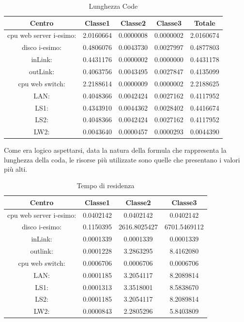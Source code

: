\begin{table}[H]
\begin{center}
\begin{tabular}{||c|c|c|c|c||}
\hline
Centro &Classe1 &Classe2 &Classe3 &Totale\\
\hline
\hline
 cpu web server i-esimo: 	&2.0160664	&0.0000008	&0.0000002	&2.0160674	\\\hline
 disco i-esimo: 	&0.4806076	&0.0043730	&0.0027997	&0.4877803	\\\hline
 inLink: 	&0.4431176	&0.0000002	&0.0000000	&0.4431178	\\\hline
 outLink: 	&0.4063756	&0.0043495	&0.0027847	&0.4135099	\\\hline
 cpu web switch: 	&2.2188614	&0.0000009	&0.0000002	&2.2188625	\\\hline
 LAN: 	&0.4048366	&0.0042424	&0.0027162	&0.4117952	\\\hline
 LS1: 	&0.4343910	&0.0044362	&0.0028402	&0.4416674	\\\hline
 LS2: 	&0.4048366	&0.0042424	&0.0027162	&0.4117952	\\\hline
 LW2: 	&0.0043640	&0.0000457	&0.0000293	&0.0044390	\\\hline
\end{tabular}
\end{center}
\caption{Lunghezza Code}
\label{lunghezzacode}
\end{table}
Come era logico aspettarsi, data la natura della formula che rappresenta la lunghezza della coda, le risorse più utilizzate sono quelle che presentano i valori più alti.
\begin{table}[H]
\begin{center}
\begin{tabular}{||c|c|c|c||}
\hline
Centro &Classe1 &Classe2 &Classe3\\
\hline
\hline
 cpu web server i-esimo: 	&0.0402142	&0.0402142	&0.0402142	\\\hline
 disco i-esimo: 	&0.1150395	&2616.8025427	&6701.5469112	\\\hline
 inLink: 	&0.0001339	&0.0001339	&0.0001339	\\\hline
 outlink: 	&0.0001228	&3.2863295	&8.4162080	\\\hline
 cpu web switch: 	&0.0006706	&0.0006706	&0.0006706	\\\hline
 LAN: 	&0.0001185	&3.2054117	&8.2089814	\\\hline
 LS1: 	&0.0001313	&3.3518001	&8.5838670	\\\hline
 LS2: 	&0.0001185	&3.2054117	&8.2089814	\\\hline
 LW2: 	&0.0000843	&2.2805296	&5.8403809	\\\hline
\end{tabular}
\end{center}
\caption{Tempo di residenza}
\label{tempodiresidenza}
\end{table}
